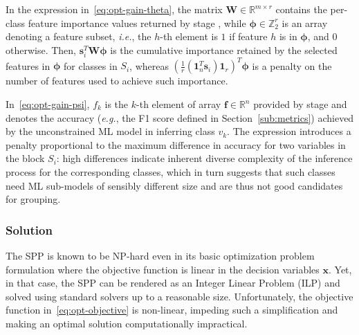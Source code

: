 \documentclass[journal]{IEEEtran}
\theoremstyle{plain} %
\newcommand{\eg}{\textit{e.g.},\xspace}
\newcommand{\ie}{\textit{i.e.},\xspace}
\newcommand{\mf}[1]{\textcolor{teal}{[Marco: #1]}}
\newcommand*\numO[1]{\raisebox{.5pt}{\textcircled{\raisebox{-.9pt} {#1}}}}
\begin{document}
In the expression in~\eqref{eq:opt-gain-theta}, the matrix $\pmb{W}\in\mathbb{R}^{m \times r}$ contains the per-class feature importance values returned by stage \numO{2},
while $\pmb{\phi} \in \mathbb{Z}^r_2$ is an array denoting a feature subset, \ie the $h$-th element is $1$ if feature $h$ is in $\pmb{\phi}$, and $0$ otherwise. Then, $\pmb{s}_i^T\pmb{W\phi}$ is the cumulative importance retained by the selected features in $\pmb{\phi}$ for classes in $S_i$, whereas $(\tfrac{1}{r}(\pmb{1}_n^T\pmb{s}_i)\pmb{1}_r)^T\pmb{\phi}$ is a penalty on the number of features used to achieve such importance.

In~\eqref{eq:opt-gain-psi}, $f_k$ is the $k$-th element of array $\pmb{f}\in\mathbb{R}^n$ provided by stage \numO{2} and denotes the accuracy (\eg the F1 score defined in Section~\ref{sub:metrics}) achieved by the unconstrained ML model in inferring class $v_k$.
The expression introduces a penalty proportional to the maximum difference in accuracy for two variables in the block $S_i$: high differences indicate inherent diverse complexity of the inference process for the corresponding classes, which in turn suggests that such classes need ML sub-models of sensibly different size and are thus not good candidates for grouping.

\vspace*{4pt}
\subsubsection{Solution}
The SPP is known to be NP-hard even in its basic optimization problem formulation where the objective function is linear in the decision variables $\pmb{x}$. Yet, in that case, the SPP can be rendered as an Integer Linear Problem (ILP) and solved using standard solvers up to a reasonable size.
Unfortunately, the objective function in~\eqref{eq:opt-objective} is non-linear, impeding such a simplification and making an optimal solution computationally impractical.
\end{document}
